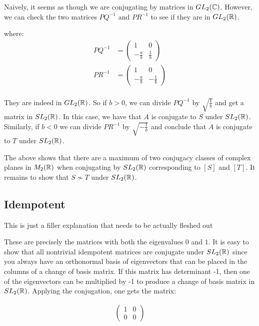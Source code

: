 \documentclass{article}
\begin{document}
Naively, it seems as though we are conjugating by matrices in $GL_2(\protect\mathbb{C})$. However, we can check the two matrices $PQ^{-1}$ and $PR^{-1}$ to see if they are in $GL_2(\protect\mathbb{R})$. 

where:
\begin{align*}
    PQ^{-1} &= \left(\begin{matrix}
        1 & 0\\
        -\frac{a}{b} & \frac{1}{b} 
    \end{matrix}\right) \\
    PR^{-1} &= \left(\begin{matrix}
        1 & 0\\
        -\frac{a}{b} & -\frac{1}{b} 
    \end{matrix}\right) \\
\end{align*}

They are indeed in $GL_2(\protect\mathbb{R})$. So if $b > 0$, we can divide $PQ^{-1}$ by $\sqrt{\frac{1}{b}}$ and get a matrix in $SL_2(\protect\mathbb{R})$. In this case, we have that $A$ is conjugate to $S$ under $SL_2(\protect\mathbb{R})$. Similarly, if $b < 0$ we can divide $PR^{-1}$ by $\sqrt{-\frac{1}{b}}$ and conclude that $A$ is conjugate to $T$ under $SL_2(\protect\mathbb{R})$.

The above shows that there are a maximum of two conjugacy classes of complex planes in $M_2(\protect\mathbb{R})$ when conjugating by $SL_2(\protect\mathbb{R})$ corresponding to $[S]$ and $[T]$. It remains to show that $S \nsim T$ under $SL_2(\protect\mathbb{R})$.

\subsection{Idempotent}
{\color{blue} This is just a filler explanation that needs to be actually fleshed out}

These are precisely the matrices with both the eigenvalues $0$ and $1$. It is easy to show that all nontrivial idempotent matrices are conjugate under $SL_2(\protect\mathbb{R})$ since you always have an orthonormal basis of eigenvectors that can be placed in the columns of a change of basis matrix. If this matrix has determinant -1, then one of the eigenvectors can be multiplied by -1 to produce a change of basis matrix in $SL_2(\protect\mathbb{R})$. Applying the conjugation, one gets the matrix:

\begin{align*}
    \left(\begin{matrix}
        1 & 0 \\
        0 & 0 
    \end{matrix}\right)
\end{align*}
\end{document}
